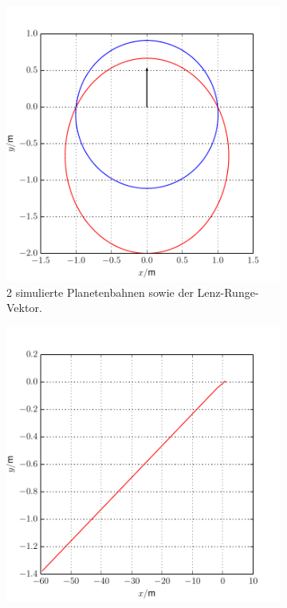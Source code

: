 \begin{figure}[H]
	\begin{subfigure}[c]{0.5\textwidth}
		\includegraphics[width = \textwidth]{../Plots/Plot_4_A_1.pdf}
		\caption{2 simulierte Planetenbahnen sowie der Lenz-Runge-Vektor.\label{fig:Bahn}}
	\end{subfigure}
	\begin{subfigure}[c]{0.5\textwidth}
		\includegraphics[width = \textwidth]{../Plots/Plot_4_A_5.pdf}

\end{subfigure}
\end{figure}
